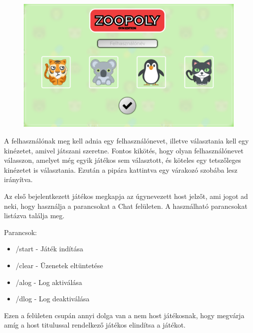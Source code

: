 

\begin{figure}[h!]
\centering
\includegraphics[width=\textwidth]{images/a5187162fb81495697aab2f5f49d6bd0.png}
\label{fig:ff}
\end{figure}

A felhasználónak meg kell adnia egy felhasználónevet, illetve választania kell egy kinézetet, amivel játszani szeretne. Fontos kikötés, hogy olyan felhasználónevet válasszon, amelyet még egyik játékos sem választott, és köteles egy tetszőleges kinézetet is választania. Ezután a pipára kattintva egy várakozó szobába lesz irányítva.


Az első bejelentkezett játékos megkapja az úgynevezett host jelzőt, ami jogot ad neki, hogy használja a parancsokat a Chat felületen. A használható parancsokat listázva találja meg.

Parancsok:
\begin{itemize}
	\item /start - Játék indítása
	\item /clear - Üzenetek eltüntetése
	\item /alog - Log aktiválása
	\item /dlog - Log deaktiválása
\end{itemize}
Ezen a felületen csupán annyi dolga van a nem host játékosnak, hogy megvárja amíg a host titulussal rendelkező játékos elindítsa a játékot.


